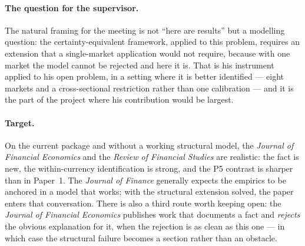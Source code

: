 \documentclass[11pt]{article}
\begin{document}
\paragraph{The question for the supervisor.} The natural framing for the meeting is not ``here are
results'' but a modelling question: the certainty-equivalent framework, applied to this problem,
requires an extension that a single-market application would not require, because with one market the
model cannot be rejected and here it is. That is his instrument applied to his open problem, in a setting where it
is better identified --- eight markets and a cross-sectional restriction rather than one calibration
--- and it is the part of the project where his contribution would be largest.

\paragraph{Target.} On the current package and without a working structural model, the \emph{Journal of
Financial Economics} and the \emph{Review of Financial Studies} are realistic: the fact is new, the
within-currency identification is strong, and the P5 contrast is sharper than in Paper~1. The
\emph{Journal of Finance} generally expects the empirics to be anchored in a model that works; with the
structural extension solved, the paper enters that conversation. There is also a third route worth
keeping open: the \emph{Journal of Financial Economics} publishes work that documents a fact and
\emph{rejects} the obvious explanation for it, when the rejection is as clean as this one --- in which
case the structural failure becomes a section rather than an obstacle.
\end{document}
